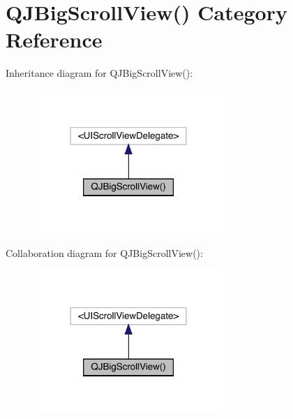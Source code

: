 \hypertarget{category_q_j_big_scroll_view_07_08}{}\section{Q\+J\+Big\+Scroll\+View() Category Reference}
\label{category_q_j_big_scroll_view_07_08}


Inheritance diagram for Q\+J\+Big\+Scroll\+View()\+:\nopagebreak
\begin{figure}[H]
\begin{center}
\leavevmode
\includegraphics[width=204pt]{category_q_j_big_scroll_view_07_08__inherit__graph}
\end{center}
\end{figure}


Collaboration diagram for Q\+J\+Big\+Scroll\+View()\+:\nopagebreak
\begin{figure}[H]
\begin{center}
\leavevmode
\includegraphics[width=204pt]{category_q_j_big_scroll_view_07_08__coll__graph}
\end{center}
\end{figure}
